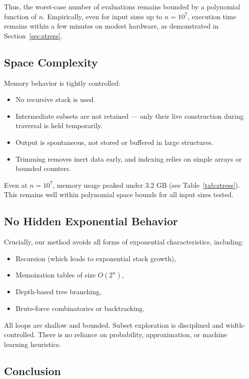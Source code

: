 \documentclass[11pt]{article}
\begin{document}
Thus, the worst-case number of evaluations remains bounded by a polynomial function of $n$. Empirically, even for input sizes up to $n = 10^7$, execution time remains within a few minutes on modest hardware, as demonstrated in Section~\ref{sec:stress}.

\subsection{Space Complexity}

Memory behavior is tightly controlled:

\begin{itemize}
    \item No recursive stack is used.
    \item Intermediate subsets are not retained — only their live construction during traversal is held temporarily.
    \item Output is spontaneous, not stored or buffered in large structures.
    \item Trimming removes inert data early, and indexing relies on simple arrays or bounded counters.
\end{itemize}

Even at $n = 10^7$, memory usage peaked under 3.2 GB (see Table~\ref{tab:stress}). This remains well within polynomial space bounds for all input sizes tested.

\subsection{No Hidden Exponential Behavior}

Crucially, our method avoids all forms of exponential characteristics, including:

\begin{itemize}
    \item Recursion (which leads to exponential stack growth),
    \item Memoization tables of size $O(2^n)$,
    \item Depth-based tree branching,
    \item Brute-force combinatorics or backtracking.
\end{itemize}

All loops are shallow and bounded. Subset exploration is disciplined and width-controlled. There is no reliance on probability, approximation, or machine learning heuristics.

\subsection{Conclusion}
\end{document}
